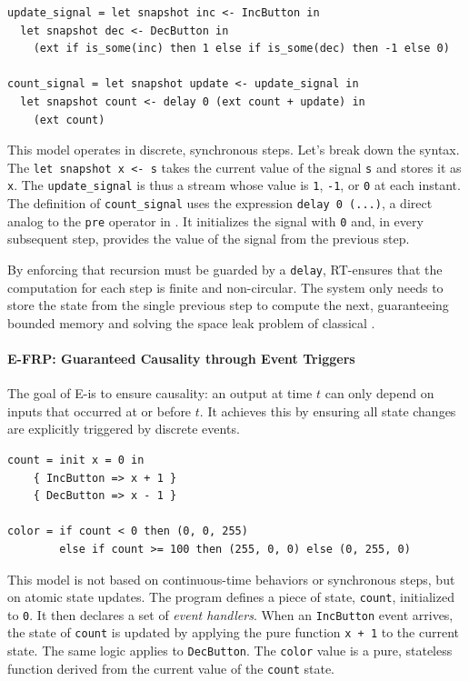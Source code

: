 \begin{lstlisting}[basicstyle=\ttfamily\footnotesize\color{BlackText}]
update_signal = let snapshot inc <- IncButton in
  let snapshot dec <- DecButton in
    (ext if is_some(inc) then 1 else if is_some(dec) then -1 else 0)

count_signal = let snapshot update <- update_signal in
  let snapshot count <- delay 0 (ext count + update) in 
    (ext count)
\end{lstlisting}

This model operates in discrete, synchronous steps. Let's break down the syntax. The
\texttt{let snapshot x <- s} takes the current value of the signal \texttt{s} and stores it as
\texttt{x}. The \texttt{update\_signal} is thus a stream whose value is \texttt{1}, \texttt{-1}, or
\texttt{0} at each instant. The definition of \texttt{count\_signal} uses the expression
\texttt{delay 0 (...)}, a direct analog to the \texttt{pre} operator in \Lustre. It initializes the
signal with \texttt{0} and, in every subsequent step, provides the value of the signal from the
previous step.

By enforcing that recursion must be guarded by a \texttt{delay}, RT-\frp ensures that the
computation for each step is finite and non-circular. The system only needs to store the state from
the single previous step to compute the next, guaranteeing bounded memory and solving the space leak
problem of classical \frp.

\paragraph*{E-FRP: Guaranteed Causality through Event Triggers}
The goal of E-\frp is to ensure causality: an output at time $t$ can only depend on inputs that
occurred at or before $t$. It achieves this by ensuring all state changes are explicitly triggered
by discrete events.

\begin{lstlisting}[basicstyle=\ttfamily\footnotesize\color{BlackText}]
count = init x = 0 in
    { IncButton => x + 1 }
    { DecButton => x - 1 }

color = if count < 0 then (0, 0, 255) 
        else if count >= 100 then (255, 0, 0) else (0, 255, 0)
\end{lstlisting}

This model is not based on continuous-time behaviors or synchronous steps, but on atomic state
updates. The program defines a piece of state, \texttt{count}, initialized to \texttt{0}. It then
declares a set of \emph{event handlers}. When an \texttt{IncButton} event arrives, the state of
\texttt{count} is updated by applying the pure function \texttt{x + 1} to the current state. The
same logic applies to \texttt{DecButton}. The \texttt{color} value is a pure, stateless function
derived from the current value of the \texttt{count} state.

